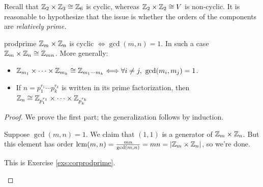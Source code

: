 
Recall that $\mathbb{Z}_2\times\mathbb{Z}_3\cong \mathbb{Z}_6$ is cyclic, whereas $\mathbb{Z}_2\times\mathbb{Z}_2\cong V$ is non-cyclic. It is reasonable to hypothesize that the issue is whether the orders of the components are \emph{relatively prime.} 

\begin{cor}{}{prodprime}
	$\mathbb{Z}_m\times\mathbb{Z}_n$ is cyclic $\Longleftrightarrow \gcd(m,n)=1$. In such a case $\mathbb{Z}_m\times\mathbb{Z}_n\cong\mathbb{Z}_{mn}$.\smallbreak
	More generally:
	\begin{itemize}\itemsep0pt
	  \item $\Z_{m_1}\times\cdots\times\Z_{m_k}\cong\Z_{m_1\cdots m_k} \Longleftrightarrow \forall i\neq j,\ \gcd(m_i,m_j)=1$.
	  \item If $n=p_1^{r_1}\cdots p_k^{r_k}$ is written in its prime factorization, then
	$\mathbb{Z}_n\cong\mathbb{Z}_{p_1^{r_1}}\times\cdots\times\mathbb{Z}_{p_k^{r_k}}$
	\end{itemize} 
\end{cor}

\begin{proof}
	We prove the first part; the generalization follows by induction.
	\begin{description}\itemsep0pt
		\item[\normalfont ($\Leftarrow$)] Suppose $\gcd(m,n)=1$. We claim that $(1,1)$ is a generator of $\mathbb{Z}_m\times\mathbb{Z}_n$. But this element has order $\operatorname{lcm}(m,n)=\frac{mn}{\gcd(m,n)} =mn =\left| \mathbb{Z}_m\times\mathbb{Z}_n\right|$, so we're done.
		\item[\normalfont ($\Rightarrow$)] This is Exercise \ref{exs:corprodprime}.\qedhere
	\end{description}
\end{proof}



